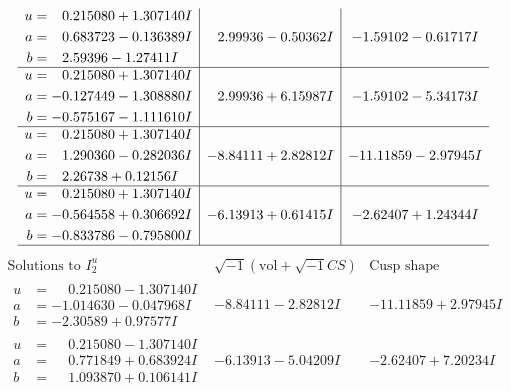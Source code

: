 \documentclass[1p]{elsarticle_modified}
\theoremstyle{definition}
\newcommand{\I}{\sqrt{-1}}
\begin{document}
$$\begin{array}{c|c|c}
\begin{aligned}
u &= \phantom{-}0.215080 + 1.307140 I \\
a &= \phantom{-}0.683723 - 0.136389 I \\
b &= \phantom{-}2.59396 - 1.27411 I\end{aligned}
 & \phantom{-}2.99936 - 0.50362 I & -1.59102 - 0.61717 I \\ \hline\begin{aligned}
u &= \phantom{-}0.215080 + 1.307140 I \\
a &= -0.127449 - 1.308880 I \\
b &= -0.575167 - 1.111610 I\end{aligned}
 & \phantom{-}2.99936 + 6.15987 I & -1.59102 - 5.34173 I \\ \hline\begin{aligned}
u &= \phantom{-}0.215080 + 1.307140 I \\
a &= \phantom{-}1.290360 - 0.282036 I \\
b &= \phantom{-}2.26738 + 0.12156 I\end{aligned}
 & -8.84111 + 2.82812 I & -11.11859 - 2.97945 I \\ \hline\begin{aligned}
u &= \phantom{-}0.215080 + 1.307140 I \\
a &= -0.564558 + 0.306692 I \\
b &= -0.833786 - 0.795800 I\end{aligned}
 & -6.13913 + 0.61415 I & -2.62407 + 1.24344 I\\
 \hline 
 \end{array}$$\newpage$$\begin{array}{c|c|c}  
\text{Solutions to }I^u_{2}& \I (\text{vol} + \sqrt{-1}CS) & \text{Cusp shape}\\
 \hline 
\begin{aligned}
u &= \phantom{-}0.215080 - 1.307140 I \\
a &= -1.014630 - 0.047968 I \\
b &= -2.30589 + 0.97577 I\end{aligned}
 & -8.84111 - 2.82812 I & -11.11859 + 2.97945 I \\ \hline\begin{aligned}
u &= \phantom{-}0.215080 - 1.307140 I \\
a &= \phantom{-}0.771849 + 0.683924 I \\
b &= \phantom{-}1.093870 + 0.106141 I\end{aligned}
 & -6.13913 - 5.04209 I & -2.62407 + 7.20234 I \\ \hline\begin{aligned}

\end{aligned}
\end{array}$$
\end{document}
